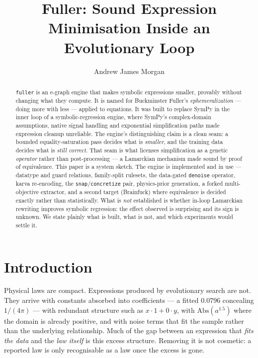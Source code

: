\documentclass[sigconf]{acmart}
\begin{document}
\title{Fuller: Sound Expression Minimisation Inside an Evolutionary Loop}

\author{Andrew James Morgan}
\renewcommand{\shortauthors}{Morgan}

\begin{abstract}
\texttt{fuller} is an e-graph engine that makes symbolic expressions smaller,
provably without changing what they compute. It is named for Buckminster
Fuller's \emph{ephemeralization} --- doing more with less --- applied to
equations. It was built to replace SymPy in the inner loop of a
symbolic-regression engine, where SymPy's complex-domain assumptions, native
signal handling and exponential simplification paths made expression cleanup
unreliable. The engine's distinguishing claim is a clean seam: a bounded
equality-saturation pass decides what is \emph{smaller}, and the training data
decides what is \emph{still correct}. That seam is what licenses simplification
as a genetic \emph{operator} rather than post-processing --- a Lamarckian
mechanism made sound by proof of equivalence. This paper is a system sketch. The
engine is implemented and in use --- datatype and guard relations, family-split
rulesets, the data-gated \texttt{denoise} operator, karva re-encoding, the
\texttt{snap}/\texttt{concretize} pair, physics-prior generation, a forked
multi-objective extractor, and a second target (Brainfuck) where equivalence is
decided exactly rather than statistically. What is \emph{not} established is
whether in-loop Lamarckian rewriting improves symbolic regression: the effect
observed is surprising and its sign is unknown. We state plainly what is built,
what is not, and which experiments would settle it.
\end{abstract}

\maketitle

\section{Introduction}
\label{sec:intro}

Physical laws are compact. Expressions produced by evolutionary search are not.
They arrive with constants absorbed into coefficients --- a fitted $0.0796$
concealing $1/(4\pi)$ --- with redundant structure such as $x\cdot 1 + 0\cdot y$,
with $\mathrm{Abs}(a^{1.5})$ where the domain is already positive, and with noise
terms that fit the sample rather than the underlying relationship. Much of the
gap between an expression that \emph{fits the data} and the \emph{law itself} is
this excess structure. Removing it is not cosmetic: a reported law is only
recognisable as a law once the excess is gone.
\end{document}
